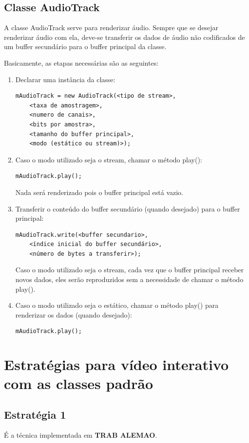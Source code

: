 \documentclass{acm_proc_article-sp}
\newcommand{\todo}[1]{\textcolor[rgb]{1.00,0.00,0.00}{\bf \uppercase{#1}}}
\begin{document}
\subsection{Classe AudioTrack}
A classe AudioTrack serve para renderizar áudio. Sempre que se desejar renderizar áudio com ela, deve-se transferir os dados de áudio não codificados de um buffer secundário para o buffer principal da classe.

Basicamente, as etapas necessárias são as seguintes:
\begin{enumerate}
 \item Declarar uma instância da classe:
  \begin{verbatim}
mAudioTrack = new AudioTrack(<tipo de stream>,
    <taxa de amostragem>,
    <numero de canais>,
    <bits por amostra>,
    <tamanho do buffer principal>,
    <modo (estático ou stream)>);
  \end{verbatim}
 \item Caso o modo utilizado seja o stream, chamar o método play():
  \begin{verbatim}
mAudioTrack.play();
  \end{verbatim}
  Nada será renderizado pois o buffer principal está vazio.
 \item Transferir o conteúdo do buffer secundário (quando desejado) para o buffer principal:
  \begin{verbatim}
mAudioTrack.write(<buffer secundario>,
    <índice inicial do buffer secundário>,
    <número de bytes a transferir>);
  \end{verbatim}
Caso o modo utilizado seja o stream, cada vez que o buffer principal receber novos dados, eles serão reproduzidos sem a necessidade de chamar o método play().
 \item Caso o modo utilizado seja o estático, chamar o método play() para renderizar os dados (quando desejado):
  \begin{verbatim}
mAudioTrack.play();
  \end{verbatim}
\end{enumerate}

\section{Estratégias para vídeo interativo com as classes padrão}

\subsection{Estratégia 1}
É a técnica implementada em \todo{trab alemao}.
\end{document}

